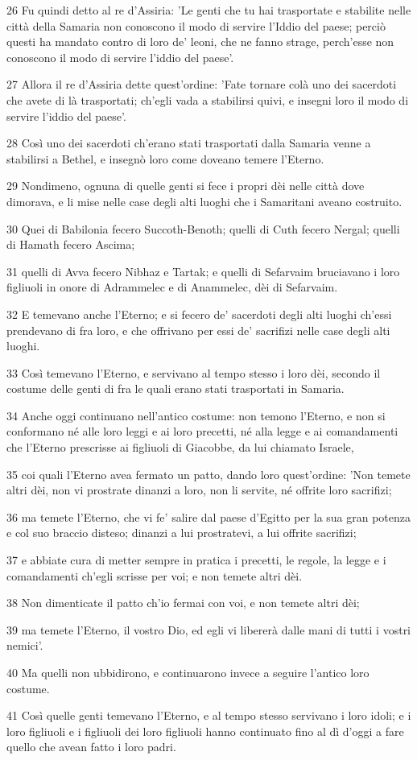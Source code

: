 \par 26 Fu quindi detto al re d'Assiria: 'Le genti che tu hai trasportate e stabilite nelle città della Samaria non conoscono il modo di servire l'Iddio del paese; perciò questi ha mandato contro di loro de' leoni, che ne fanno strage, perch'esse non conoscono il modo di servire l'iddio del paese'.
\par 27 Allora il re d'Assiria dette quest'ordine: 'Fate tornare colà uno dei sacerdoti che avete di là trasportati; ch'egli vada a stabilirsi quivi, e insegni loro il modo di servire l'iddio del paese'.
\par 28 Così uno dei sacerdoti ch'erano stati trasportati dalla Samaria venne a stabilirsi a Bethel, e insegnò loro come doveano temere l'Eterno.
\par 29 Nondimeno, ognuna di quelle genti si fece i propri dèi nelle città dove dimorava, e li mise nelle case degli alti luoghi che i Samaritani aveano costruito.
\par 30 Quei di Babilonia fecero Succoth-Benoth; quelli di Cuth fecero Nergal; quelli di Hamath fecero Ascima;
\par 31 quelli di Avva fecero Nibhaz e Tartak; e quelli di Sefarvaim bruciavano i loro figliuoli in onore di Adrammelec e di Anammelec, dèi di Sefarvaim.
\par 32 E temevano anche l'Eterno; e si fecero de' sacerdoti degli alti luoghi ch'essi prendevano di fra loro, e che offrivano per essi de' sacrifizi nelle case degli alti luoghi.
\par 33 Così temevano l'Eterno, e servivano al tempo stesso i loro dèi, secondo il costume delle genti di fra le quali erano stati trasportati in Samaria.
\par 34 Anche oggi continuano nell'antico costume: non temono l'Eterno, e non si conformano né alle loro leggi e ai loro precetti, né alla legge e ai comandamenti che l'Eterno prescrisse ai figliuoli di Giacobbe, da lui chiamato Israele,
\par 35 coi quali l'Eterno avea fermato un patto, dando loro quest'ordine: 'Non temete altri dèi, non vi prostrate dinanzi a loro, non li servite, né offrite loro sacrifizi;
\par 36 ma temete l'Eterno, che vi fe' salire dal paese d'Egitto per la sua gran potenza e col suo braccio disteso; dinanzi a lui prostratevi, a lui offrite sacrifizi;
\par 37 e abbiate cura di metter sempre in pratica i precetti, le regole, la legge e i comandamenti ch'egli scrisse per voi; e non temete altri dèi.
\par 38 Non dimenticate il patto ch'io fermai con voi, e non temete altri dèi;
\par 39 ma temete l'Eterno, il vostro Dio, ed egli vi libererà dalle mani di tutti i vostri nemici'.
\par 40 Ma quelli non ubbidirono, e continuarono invece a seguire l'antico loro costume.
\par 41 Così quelle genti temevano l'Eterno, e al tempo stesso servivano i loro idoli; e i loro figliuoli e i figliuoli dei loro figliuoli hanno continuato fino al dì d'oggi a fare quello che avean fatto i loro padri.

